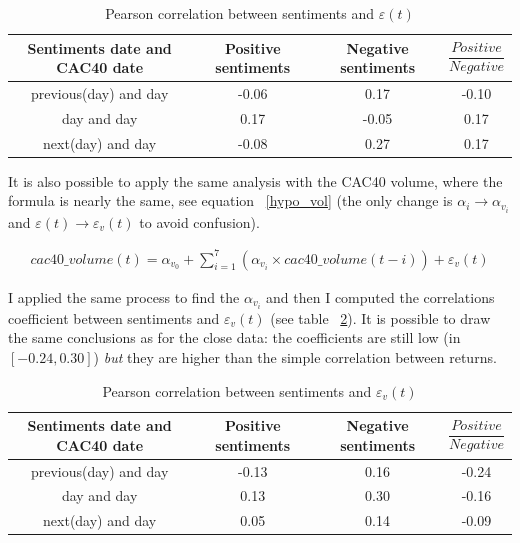 \documentclass[12pt]{report}
\begin{document}
\begin{table}
	\begin{tabular}{|c || c | c | c|}
		\hline
		Sentiments date and CAC40 date & Positive sentiments & Negative sentiments & $\dfrac{Positive}{Negative}$\\
		\hline
		previous(day) and day & -0.06 & 0.17 & -0.10\\
		\hline
		day and day & 0.17 & -0.05 & 0.17\\
		\hline
		next(day) and day & -0.08 & 0.27 & 0.17\\
		\hline
	\end{tabular}

	\caption{Pearson correlation between sentiments and $\varepsilon(t)$\label{pearson_cac_ar}}
\end{table}

It is also possible to apply the same analysis with the CAC40 volume, where the formula is nearly the same, see equation ~\ref{hypo_vol} (the only change is $\alpha_i \rightarrow \alpha_{v_i}$ and $\varepsilon(t) \rightarrow \varepsilon_v(t)$ to avoid confusion).

\begin{eqnarray}
	cac40\_volume(t) = \alpha_{v_0} + \sum_{i = 1}^{7}\left(\alpha_{v_i}\times{}cac40\_volume(t - i)\right) + \varepsilon_v(t)\label{hypo_vol}
\end{eqnarray}

I applied the same process to find the $\alpha_{v_i}$ and then I computed the correlations coefficient between sentiments and $\varepsilon_v(t)$ (see table ~\ref{pearson_cac_vol_ar}). It is possible to draw the same conclusions as for the close data: the coefficients are still low (in $[-0.24, 0.30]$) \emph{but} they are higher than the simple correlation between returns.

\begin{table}
	\begin{tabular}{|c || c | c | c|}
		\hline
		Sentiments date and CAC40 date & Positive sentiments & Negative sentiments & $\dfrac{Positive}{Negative}$\\
		\hline
		previous(day) and day & -0.13 & 0.16 & -0.24\\
		\hline
		day and day & 0.13 & 0.30 & -0.16\\
		\hline
		next(day) and day & 0.05 & 0.14 & -0.09\\
		\hline
	\end{tabular}

	\caption{Pearson correlation between sentiments and $\varepsilon_v(t)$\label{pearson_cac_vol_ar}}
\end{table}
\end{document}
